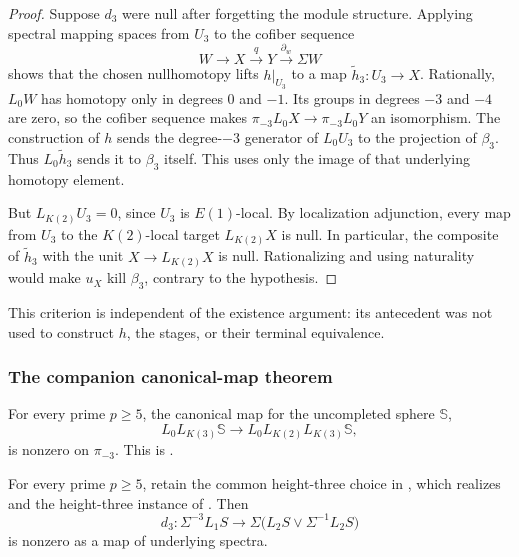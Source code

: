 \begin{proof}
Suppose \(d_3\) were null after forgetting the module structure.
Applying spectral mapping spaces from \(U_3\) to the
cofiber sequence
\[
 W\longrightarrow X\xrightarrow qY\xrightarrow{\partial_w}\Sigma W
\]
shows that the chosen nullhomotopy lifts \(h|_{U_3}\) to a map
\(\widetilde h_3:U_3\to X\).
Rationally, \(L_0W\) has homotopy only in degrees \(0\) and
\(-1\).  Its groups in degrees \(-3\) and \(-4\) are zero,
so the cofiber sequence makes
\(\pi_{-3}L_0X\to\pi_{-3}L_0Y\) an isomorphism.
The construction of \(h\) sends the degree-\(-3\) generator
of \(L_0U_3\) to the projection of \(\beta_3\).
Thus \(L_0\widetilde h_3\) sends it to \(\beta_3\) itself.
This uses only the image of that underlying homotopy element.

But \(L_{K(2)}U_3=0\), since \(U_3\) is \(E(1)\)-local.
By localization adjunction, every map from \(U_3\) to the
\(K(2)\)-local target \(L_{K(2)}X\) is null.  In particular,
the composite of \(\widetilde h_3\) with the unit
\(X\to L_{K(2)}X\) is null.  Rationalizing and using naturality
would make \(u_X\) kill \(\beta_3\), contrary to the hypothesis.
\end{proof}

This criterion is independent of the existence argument:
its antecedent was not used to construct \(h\), the stages, or
their terminal equivalence.

\subsubsection{The companion canonical-map theorem}

For every prime \(p\geq5\), the canonical map for the uncompleted
sphere \(\mathbb S\),
\begin{equation}\label{eq:companion-map}
 L_0L_{K(3)}\mathbb S
 \longrightarrow L_0L_{K(2)}L_{K(3)}\mathbb S,
\end{equation}
is nonzero on \(\pi_{-3}\).
This is \cite[Theorem~1.1]{CompanionHeightThreeObstruction}.

\begin{corollary}\label{cor:nonzero-attachment}
For every prime \(p\geq5\), retain the common height-three choice
in , which realizes  and the
height-three instance of .
Then
\[
 d_3:\Sigma^{-3}L_1S\longrightarrow
       \Sigma\bigl(L_2S\vee\Sigma^{-1}L_2S\bigr)
\]
is nonzero as a map of underlying spectra.
\end{corollary}

